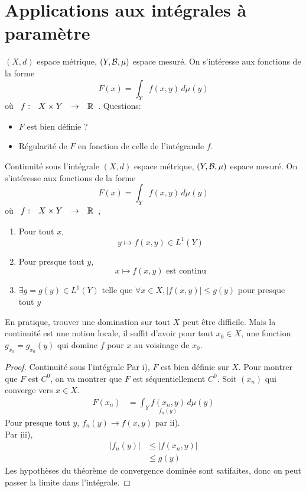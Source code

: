 \documentclass[]{report}
\begin{document}
\section{Applications aux intégrales à paramètre}

$(X,d)$ espace métrique, $(Y,\mathcal{B},\mu)$ espace mesuré. On s'intéresse aux fonctions de la forme
\[F(x)=\int_Y f(x,y)\, d\mu(y)\]
où $\begin{array}{ccccc} f : & X\times Y & \to & \mathbb{R} \end{array}$. Questions:
\begin{itemize}
    \item $F$ est bien définie ?
    \item Régularité de $F$ en fonction de celle de l'intégrande $f$.
\end{itemize}

\begin{tm}{Continuité sous l'intégrale}{}
    $(X,d)$ espace métrique, $(Y,\mathcal{B},\mu)$ espace mesuré. On s'intéresse aux fonctions de la forme
    \[F(x)=\int_Y f(x,y)\, d\mu(y)\]
    où $\begin{array}{ccccc} f : & X\times Y & \to & \mathbb{R} \end{array}$,
    \begin{enumerate}[label=\roman*]
        \item Pour tout $x$,
              \[y\mapsto f(x,y)\in L^1(Y)\]
        \item Pour presque tout $y$,
              \[x\mapsto f(x,y)\text{ est continu}\]
        \item $\exists g=g(y)\in L^1(Y)$ telle que $\forall x\in X, \left|f(x,y)\right|\le g(y)$ pour presque tout $y$
    \end{enumerate}
\end{tm}

\begin{re}{}{}
    En pratique, trouver une domination sur tout $X$ peut être difficile. Mais la continuité est une notion locale, il suffit d'avoir pour tout $x_0\in X$, une fonction $g_{x_0}=g_{x_0}(y)$ qui domine $f$ pour $x$ au voisinage de $x_0$.
\end{re}

\begin{proof}{Continuité sous l'intégrale}{}
    Par i), $F$ est bien définie sur $X$. Pour montrer que $F$ est $C^0$, on va montrer que $F$ est séquentiellement $C^0$. Soit $(x_n)$ qui converge vers $x\in X$.
    \begin{align*}
        F(x_n) & =\int_Y \underset{f_n(y)}{f(x_n,y)}\, d\mu (y)
    \end{align*}
    Pour presque tout $y$, $f_n(y)\to f(x,y)$ par ii).\\
    Par iii),
    \begin{align*}
        \left|f_n(y)\right| & \le \left| f(x_n,y)\right| \\
                            & \le g(y)
    \end{align*}
    Les hypothèses du théorème de convergence dominée sont satifaites, donc on peut passer la limite dans l'intégrale.
\end{proof}
\end{document}
